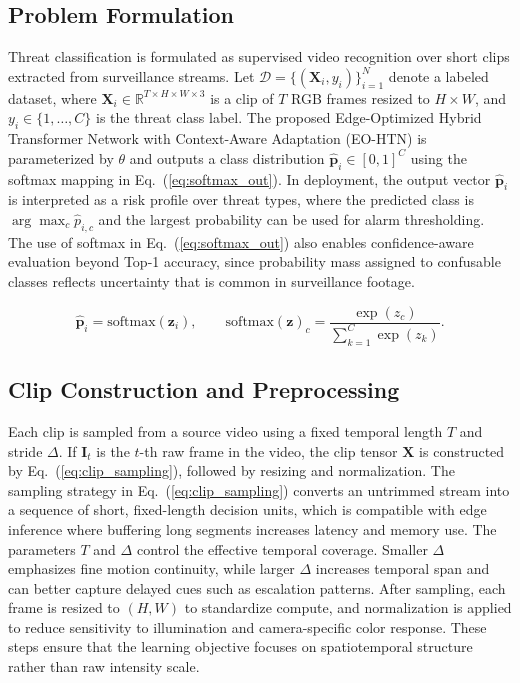 \documentclass[AMA,Times1COL]{WileyNJDv5} %
\begin{document}
\subsection{Problem Formulation}
Threat classification is formulated as supervised video recognition over short clips extracted from surveillance streams. Let $\mathcal{D}=\{(\mathbf{X}_i, y_i)\}_{i=1}^{N}$ denote a labeled dataset, where $\mathbf{X}_i \in \mathbb{R}^{T\times H \times W \times 3}$ is a clip of $T$ RGB frames resized to $H \times W$, and $y_i \in \{1,\dots,C\}$ is the threat class label. The proposed Edge-Optimized Hybrid Transformer Network with Context-Aware Adaptation (EO-HTN) is parameterized by $\theta$ and outputs a class distribution $\hat{\mathbf{p}}_i \in [0,1]^C$ using the softmax mapping in Eq.~(\ref{eq:softmax_out}). In deployment, the output vector $\hat{\mathbf{p}}_i$ is interpreted as a risk profile over threat types, where the predicted class is $\arg\max_c \hat{p}_{i,c}$ and the largest probability can be used for alarm thresholding. The use of softmax in Eq.~(\ref{eq:softmax_out}) also enables confidence-aware evaluation beyond Top-1 accuracy, since probability mass assigned to confusable classes reflects uncertainty that is common in surveillance footage.

\begin{equation}
\hat{\mathbf{p}}_i = \mathrm{softmax}\!\left(\mathbf{z}_i\right), \qquad 
\mathrm{softmax}(\mathbf{z})_c = \frac{\exp(z_c)}{\sum_{k=1}^{C}\exp(z_k)} .
\label{eq:softmax_out}
\end{equation}

\subsection{Clip Construction and Preprocessing}
Each clip is sampled from a source video using a fixed temporal length $T$ and stride $\Delta$. If $\mathbf{I}_t$ is the $t$-th raw frame in the video, the clip tensor $\mathbf{X}$ is constructed by Eq.~(\ref{eq:clip_sampling}), followed by resizing and normalization. The sampling strategy in Eq.~(\ref{eq:clip_sampling}) converts an untrimmed stream into a sequence of short, fixed-length decision units, which is compatible with edge inference where buffering long segments increases latency and memory use. The parameters $T$ and $\Delta$ control the effective temporal coverage. Smaller $\Delta$ emphasizes fine motion continuity, while larger $\Delta$ increases temporal span and can better capture delayed cues such as escalation patterns. After sampling, each frame is resized to $(H,W)$ to standardize compute, and normalization is applied to reduce sensitivity to illumination and camera-specific color response. These steps ensure that the learning objective focuses on spatiotemporal structure rather than raw intensity scale.
\end{document}
